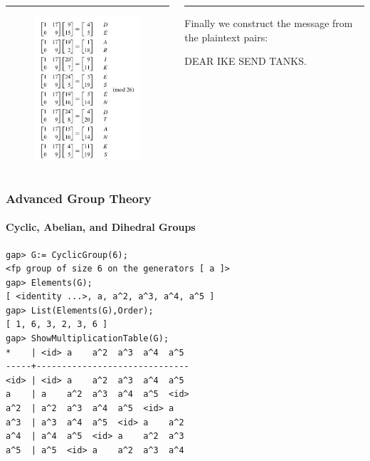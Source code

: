 \documentclass{beamer}
\theoremstyle{definition}
\theoremstyle{remark}
\begin{document}
	
\begin{frame}
	\begin{columns}[T] %
		\begin{column}{.48\textwidth}
			\color{red}\rule{\linewidth}{4pt}
			\begin{figure}
				\includegraphics[scale=0.5]{HillBreak}
			\end{figure}
		\end{column}%
		\hfill%
		\begin{column}{.48\textwidth}
			\color{blue}\rule{\linewidth}{4pt}
			Finally we construct the message from the plaintext pairs:
			
			DEAR IKE SEND TANKS.
		\end{column}%
	\end{columns}
\end{frame}

\LogoOn
\begin{frame}[fragile]
	\frametitle{Advanced Group Theory}
	\framesubtitle{Cyclic, Abelian, and Dihedral Groups}
\begin{verbatim}
gap> G:= CyclicGroup(6);
<fp group of size 6 on the generators [ a ]>
gap> Elements(G);
[ <identity ...>, a, a^2, a^3, a^4, a^5 ]
gap> List(Elements(G),Order);
[ 1, 6, 3, 2, 3, 6 ]
gap> ShowMultiplicationTable(G);
*    | <id> a    a^2  a^3  a^4  a^5
-----+------------------------------
<id> | <id> a    a^2  a^3  a^4  a^5
a    | a    a^2  a^3  a^4  a^5  <id>
a^2  | a^2  a^3  a^4  a^5  <id> a
a^3  | a^3  a^4  a^5  <id> a    a^2
a^4  | a^4  a^5  <id> a    a^2  a^3
a^5  | a^5  <id> a    a^2  a^3  a^4
\end{verbatim}
\end{frame}
\end{document}
